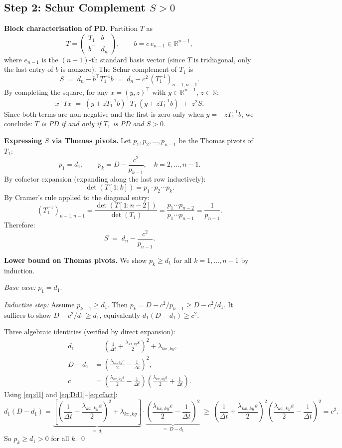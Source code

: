 \documentclass[11pt]{article}
\newcommand{\eps}{\varepsilon}
\newcommand{\dt}{\Delta t}
\newcommand{\RR}{\mathbb{R}}
\newcommand{\lxy}{\lambda_{kx,ky}}
\begin{document}
\subsection{Step 2: Schur Complement $S > 0$}

\textbf{Block characterisation of PD.}
Partition $T$ as
\[
  T = \begin{pmatrix} T_1 & b \\ b^\top & d_n \end{pmatrix},
  \qquad b = c\, e_{n-1} \in \RR^{n-1},
\]
where $e_{n-1}$ is the $(n-1)$-th standard basis vector (since $T$ is tridiagonal,
only the last entry of $b$ is nonzero).
The Schur complement of $T_1$ is
\[
  S \;=\; d_n - b^\top T_1^{-1} b \;=\; d_n - c^2\,(T_1^{-1})_{n-1,n-1}.
\]
By completing the square, for any $x = (y, z)^\top$ with $y \in \RR^{n-1}$, $z \in \RR$:
\[
  x^\top T x \;=\; (y + z T_1^{-1}b)^\top T_1\,(y + z T_1^{-1}b) \;+\; z^2 S.
\]
Since both terms are non-negative and the first is zero only when $y = -z T_1^{-1}b$,
we conclude: \emph{$T$ is PD if and only if $T_1$ is PD and $S > 0$}.

\medskip\noindent
\textbf{Expressing $S$ via Thomas pivots.}
Let $p_1, p_2, \ldots, p_{n-1}$ be the Thomas pivots of $T_1$:
\[
  p_1 = d_1, \qquad p_k = D - \frac{c^2}{p_{k-1}}, \quad k = 2,\ldots, n-1.
\]
By cofactor expansion (expanding along the last row inductively):
\[
  \det(T[1:k]) = p_1 \cdot p_2 \cdots p_k.
\]
By Cramer's rule applied to the diagonal entry:
\[
  (T_1^{-1})_{n-1,n-1}
  = \frac{\det(T[1:n-2])}{\det(T_1)}
  = \frac{p_1 \cdots p_{n-2}}{p_1 \cdots p_{n-1}}
  = \frac{1}{p_{n-1}}.
\]
Therefore:
\[
  S \;=\; d_n - \frac{c^2}{p_{n-1}}.
\]

\medskip\noindent
\textbf{Lower bound on Thomas pivots.}
We show $p_k \geq d_1$ for all $k = 1, \ldots, n-1$ by induction.

\emph{Base case:} $p_1 = d_1$. \checkmark

\emph{Inductive step:} Assume $p_{k-1} \geq d_1$.
Then $p_k = D - c^2/p_{k-1} \geq D - c^2/d_1$.
It suffices to show $D - c^2/d_1 \geq d_1$, equivalently $d_1(D - d_1) \geq c^2$.

Three algebraic identities (verified by direct expansion):
\begin{align}
  d_1     &= \left(\frac{1}{\dt} + \frac{\lxy\eps}{2}\right)^{\!2} + \lxy, \label{eq:d1}\\
  D - d_1 &= \left(\frac{\lxy\eps}{2} - \frac{1}{\dt}\right)^{\!2},         \label{eq:Dd1}\\
  c       &= \left(\frac{\lxy\eps}{2} - \frac{1}{\dt}\right)
             \left(\frac{\lxy\eps}{2} + \frac{1}{\dt}\right).                \label{eq:cfact}
\end{align}
Using \eqref{eq:d1} and \eqref{eq:Dd1}--\eqref{eq:cfact}:
\[
  d_1(D - d_1)
  = \underbrace{\left[\left(\frac{1}{\dt}+\frac{\lxy\eps}{2}\right)^{\!2}+\lxy\right]}_{=\,d_1}
    \cdot
    \underbrace{\left(\frac{\lxy\eps}{2}-\frac{1}{\dt}\right)^{\!2}}_{=\,D-d_1}
  \;\geq\;
    \left(\frac{1}{\dt}+\frac{\lxy\eps}{2}\right)^{\!2}
    \left(\frac{\lxy\eps}{2}-\frac{1}{\dt}\right)^{\!2}
  = c^2.
\]
So $p_k \geq d_1 > 0$ for all $k$. \qed
\end{document}
